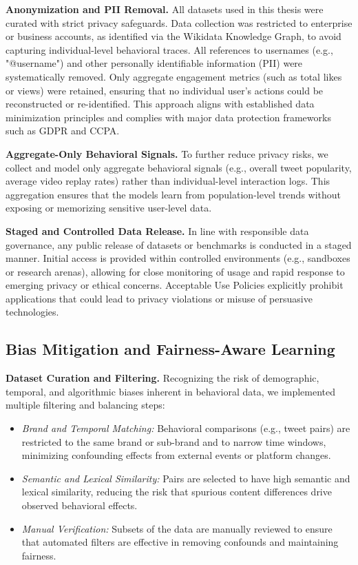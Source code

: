 \textbf{Anonymization and PII Removal.}
All datasets used in this thesis were curated with strict privacy safeguards. Data collection was restricted to enterprise or business accounts, as identified via the Wikidata Knowledge Graph, to avoid capturing individual-level behavioral traces. All references to usernames (e.g., "@username") and other personally identifiable information (PII) were systematically removed. Only aggregate engagement metrics (such as total likes or views) were retained, ensuring that no individual user’s actions could be reconstructed or re-identified. This approach aligns with established data minimization principles and complies with major data protection frameworks such as GDPR and CCPA.

\textbf{Aggregate-Only Behavioral Signals.}
To further reduce privacy risks, we collect and model only aggregate behavioral signals (e.g., overall tweet popularity, average video replay rates) rather than individual-level interaction logs. This aggregation ensures that the models learn from population-level trends without exposing or memorizing sensitive user-level data.


\textbf{Staged and Controlled Data Release.}
In line with responsible data governance, any public release of datasets or benchmarks is conducted in a staged manner. Initial access is provided within controlled environments (e.g., sandboxes or research arenas), allowing for close monitoring of usage and rapid response to emerging privacy or ethical concerns. Acceptable Use Policies explicitly prohibit applications that could lead to privacy violations or misuse of persuasive technologies.


\subsection{Bias Mitigation and Fairness-Aware Learning}
\textbf{Dataset Curation and Filtering.}
Recognizing the risk of demographic, temporal, and algorithmic biases inherent in behavioral data, we implemented multiple filtering and balancing steps:
\begin{itemize}

    \item \textit{Brand and Temporal Matching:} Behavioral comparisons (e.g., tweet pairs) are restricted to the same brand or sub-brand and to narrow time windows, minimizing confounding effects from external events or platform changes.
    
    \item \textit{Semantic and Lexical Similarity:} Pairs are selected to have high semantic and lexical similarity, reducing the risk that spurious content differences drive observed behavioral effects.

    \item \textit{Manual Verification:} Subsets of the data are manually reviewed to ensure that automated filters are effective in removing confounds and maintaining fairness.
\end{itemize}




